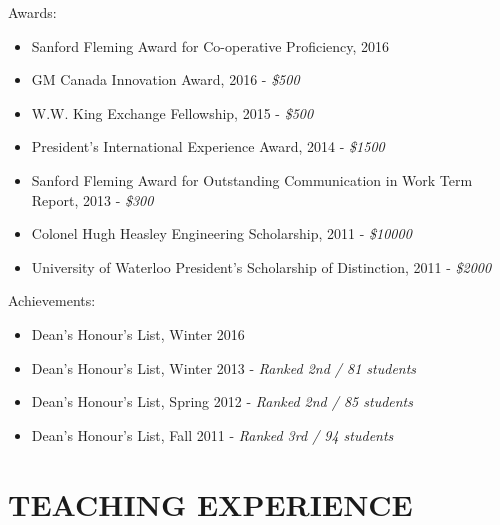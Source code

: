 \documentclass[10pt]{res} %
\begin{document}
Awards:
\begin{itemize} 
    \item Sanford Fleming Award for Co-operative Proficiency, 2016
    \item GM Canada Innovation Award, 2016 - {\sl\$500}
    \item W.W. King Exchange Fellowship, 2015 - {\sl\$500}
    \item President's International Experience Award, 2014 - {\sl\$1500}
    \item Sanford Fleming Award for Outstanding Communication in Work Term Report, 2013 - {\sl\$300}
    \item Colonel Hugh Heasley Engineering Scholarship, 2011 - {\sl\$10000}
    \item University of Waterloo President's Scholarship of Distinction, 2011 - {\sl\$2000}
\end{itemize}

Achievements:
\begin{itemize} 
    \item Dean's Honour's List, Winter 2016
    \item Dean's Honour's List, Winter 2013 - {\sl Ranked 2nd / 81 students}
    \item Dean's Honour's List, Spring 2012 - {\sl Ranked 2nd / 85 students}
    \item Dean's Honour's List, Fall 2011 - {\sl Ranked 3rd / 94 students}
\end{itemize}


\section{TEACHING EXPERIENCE}

\vspace{0.2in} %
\end{document}
